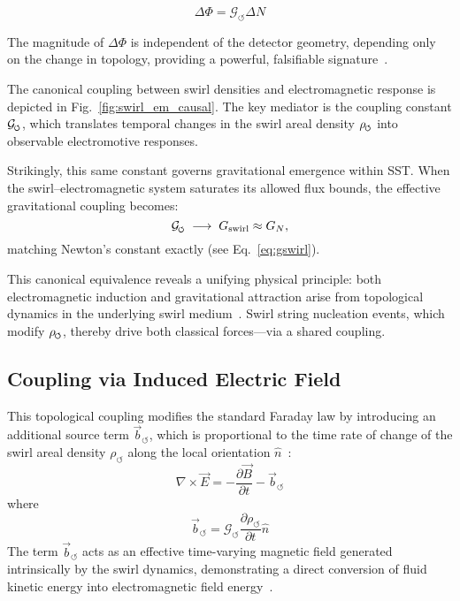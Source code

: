 \documentclass[10pt,reprint,aps,onecolumn,nofootinbib]{revtex4-2}
\begin{document}
\[
\Delta\Phi = \mathcal{G}_{\circlearrowleft} \Delta N
\]

The magnitude of $\Delta\Phi$ is independent of the detector geometry, depending only on the change in topology, providing a powerful, falsifiable signature~\cite{2}.

 

    The canonical coupling between swirl densities and electromagnetic response is depicted in Fig.~\ref{fig:swirl_em_causal}. The key mediator is the coupling constant \(\mathcal{G}_{\mkern-2mu\scriptscriptstyle\boldsymbol{\circlearrowleft}}\), which translates temporal changes in the swirl areal density \(\rho_{\mkern-2mu\scriptscriptstyle\boldsymbol{\circlearrowleft}}\) into observable electromotive responses.

    Strikingly, this same constant governs gravitational emergence within SST. When the swirl–electromagnetic system saturates its allowed flux bounds, the effective gravitational coupling becomes:
    \[
        \mathcal{G}_{\mkern-2mu\scriptscriptstyle\boldsymbol{\circlearrowleft}} \;\longrightarrow\; G_{\mathrm{swirl}} \approx G_N,
    \]
    matching Newton’s constant exactly (see Eq.~\ref{eq:gswirl}).

    This canonical equivalence reveals a unifying physical principle: both electromagnetic induction and gravitational attraction arise from topological dynamics in the underlying swirl medium~\cite{2}. Swirl string nucleation events, which modify \(\rho_{\mkern-2mu\scriptscriptstyle\boldsymbol{\circlearrowleft}}\), thereby drive both classical forces—via a shared coupling.





\subsection*{Coupling via Induced Electric Field}

This topological coupling modifies the standard Faraday law by introducing an additional source term $\vec{b}_{\circlearrowleft}$, which is proportional to the time rate of change of the swirl areal density $\rho_{\circlearrowleft}$ along the local orientation $\hat{n}$~\cite{2}:
\begin{equation}
\nabla \times \vec{E} = - \frac{\partial \vec{B}}{\partial t} - \vec{b}_{\circlearrowleft}
\label{eq:modfaraday}
\end{equation}
where
\[
\vec{b}_{\circlearrowleft} = \mathcal{G}_{\circlearrowleft} \frac{\partial \rho_{\circlearrowleft}}{\partial t} \hat{n}
\]
The term $\vec{b}_{\circlearrowleft}$ acts as an effective time-varying magnetic field generated intrinsically by the swirl dynamics, demonstrating a direct conversion of fluid kinetic energy into electromagnetic field energy~\cite{2}.
\end{document}
